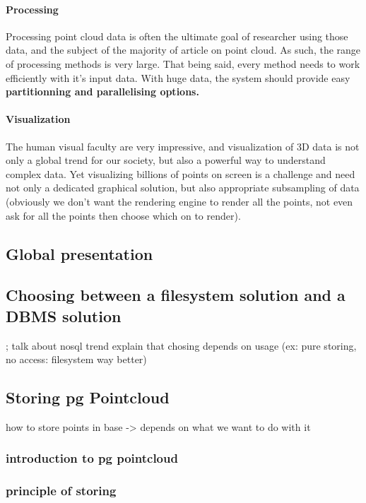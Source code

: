 			\paragraph{Processing}
				Processing point cloud data is often the ultimate goal of researcher using those data, and the subject of the majority of article on point cloud.
				As such, the range of processing methods is very large. That being said, every method needs to work efficiently with it's input data.
				With huge data, the system should provide easy \bf{partitionning} and \bf{parallelising} options.
			
			\paragraph{Visualization}	 			 
	 			The human visual faculty are very impressive, and visualization of 3D data is not only a global trend for our society, but also a powerful way to understand complex data.
	 			Yet visualizing billions of points on screen is a challenge and need not only a dedicated graphical solution, but also appropriate subsampling of data (obviously we don't want the rendering engine to render all the points, not even ask for all the points then choose which on to render).
	 			
	\subsection{Global presentation}
		
	\subsection{Choosing between a filesystem solution and a DBMS solution}
		
		;
 		talk about nosql trend
 		explain that chosing depends on usage
 		(ex: pure storing, no access: filesystem way better)
	\subsection{Storing pg Pointcloud}
 		how to store points in base
 		-> depends on what we want to do with it
		\subsubsection{introduction to pg pointcloud}
		\subsubsection{principle of storing}
